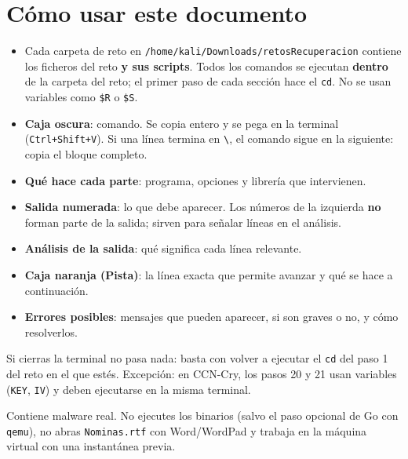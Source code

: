 \documentclass[11pt,a4paper]{article}
\begin{document}
\clearpage
\tableofcontents
\clearpage


\section{Cómo usar este documento}
\begin{itemize}
  \item Cada carpeta de reto en \texttt{/home/kali/Downloads/retosRecuperacion} contiene los ficheros del reto
        \textbf{y sus scripts}. Todos los comandos se ejecutan \textbf{dentro} de la carpeta del reto; el primer paso de
        cada sección hace el \texttt{cd}. No se usan variables como \texttt{\$R} o \texttt{\$S}.
  \item \textbf{Caja oscura}: comando. Se copia entero y se pega en la terminal (\texttt{Ctrl+Shift+V}). Si una línea
        termina en \texttt{\textbackslash}, el comando sigue en la siguiente: copia el bloque completo.
  \item \textbf{Qué hace cada parte}: programa, opciones y librería que intervienen.
  \item \textbf{Salida numerada}: lo que debe aparecer. Los números de la izquierda \textbf{no} forman parte de la salida;
        sirven para señalar líneas en el análisis.
  \item \textbf{Análisis de la salida}: qué significa cada línea relevante.
  \item \textbf{Caja naranja (Pista)}: la línea exacta que permite avanzar y qué se hace a continuación.
  \item \textbf{Errores posibles}: mensajes que pueden aparecer, si son graves o no, y cómo resolverlos.
\end{itemize}

\begin{nota}
Si cierras la terminal no pasa nada: basta con volver a ejecutar el \texttt{cd} del paso 1 del reto en el que estés.
Excepción: en CCN-Cry, los pasos 20 y 21 usan variables (\texttt{KEY}, \texttt{IV}) y deben ejecutarse en la misma terminal.
\end{nota}

\begin{aviso}[Seguridad]
Contiene malware real. No ejecutes los binarios (salvo el paso opcional de Go con \texttt{qemu}), no abras
\texttt{Nominas.rtf} con Word/WordPad y trabaja en la máquina virtual con una instantánea previa.
\end{aviso}
\end{document}
